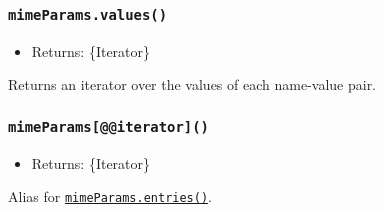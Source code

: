 \subsubsection{\texorpdfstring{\texttt{mimeParams.values()}}{mimeParams.values()}}\label{mimeparams.values}

\begin{itemize}
\tightlist
\item
  Returns: \{Iterator\}
\end{itemize}

Returns an iterator over the values of each name-value pair.

\subsubsection{\texorpdfstring{\texttt{mimeParams{[}@@iterator{]}()}}{mimeParams{[}@@iterator{]}()}}\label{mimeparamsiterator}

\begin{itemize}
\tightlist
\item
  Returns: \{Iterator\}
\end{itemize}

Alias for \hyperref[mimeparamsentries]{\texttt{mimeParams.entries()}}.

\begin{Shaded}
\begin{Highlighting}[]
 \OperatorTok{;}

\OperatorTok{=}  \NormalTok{(}\NormalTok{)}\OperatorTok{;}
\NormalTok{ (}\NormalTok{ [name}\OperatorTok{,}\NormalTok{ value] }
  \OperatorTok{,}\OperatorTok{;}
\NormalTok{\}}
\end{Highlighting}
\end{Shaded}

